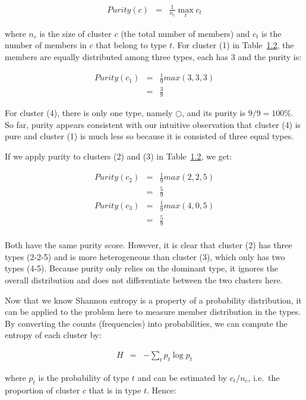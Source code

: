 \documentclass[
  letterpaper,
]{scrbook}
\begin{document}
\[\begin{aligned}
  Purity(c) & = & \frac{1}{n_c} \max_t c_t
\end{aligned}\]

where \(n_c\) is the size of cluster \(c\) (the total number of members)
and \(c_t\) is the number of members in \(c\) that belong to type \(t\).
For cluster (1) in Table~\hyperref[tab-info-groups]{1.2}, the members
are equally distributed among three types, each has \(3\) and the purity
is:

\[\begin{aligned}
  Purity(c_1)
  & = & \frac{1}{9} max(3, 3, 3) \\
  & = & \frac{3}{9}
\end{aligned}\]

For cluster (4), there is only one type, namely \(\bigcirc\), and its
purity is \(9/9 = 100\%\). So far, purity appears consistent with our
intuitive observation that cluster (4) is pure and cluster (1) is much
less so because it is consisted of three equal types.

If we apply purity to clusters (2) and (3) in
Table~\hyperref[tab-info-groups]{1.2}, we get:

\[\begin{aligned}
  Purity(c_2)
  & = & \frac{1}{9} max(2, 2, 5) \\
  & = & \frac{5}{9} \\
  Purity(c_3)
  & = & \frac{1}{9} max(4, 0, 5) \\
  & = & \frac{5}{9} \\
\end{aligned}\]

Both have the same purity score. However, it is clear that cluster (2)
has three types (2-2-5) and is more heterogeneous than cluster (3),
which only has two types (4-5). Because purity only relies on the
dominant type, it ignores the overall distribution and does not
differentiate between the two clusters here.

Now that we know Shannon entropy is a property of a probability
distribution, it can be applied to the problem here to measure member
distribution in the types. By converting the counts (frequencies) into
probabilities, we can compute the entropy of each cluster by:

\[\begin{aligned}
  H & = & - \sum_t p_t \log p_t
\end{aligned}\]

where \(p_t\) is the probability of type \(t\) and can be estimated by
\(c_t/n_c\), i.e.~the proportion of cluster \(c\) that is in type \(t\).
Hence:
\end{document}
